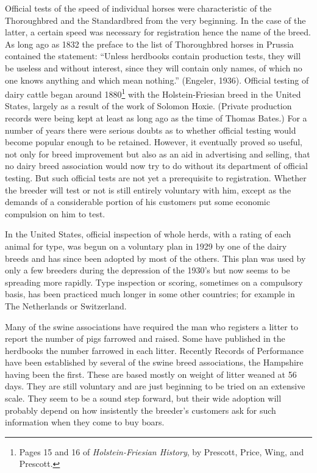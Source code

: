 Official tests of the speed of individual horses were characteristic of the Thoroughbred and the Standardbred from the very 
beginning. In the case of the latter, a certain speed was necessary for registration hence the name of the breed. As long 
ago as 1832 the preface to the list of Thoroughbred horses in Prussia contained the statement: ``Unless herdbooks contain 
production tests, they will be useless and without interest, since they will contain only names, of which no one knows
anything and which mean nothing.'' (Engeler, 1936). Official testing of dairy cattle began around 1880\footnote{Pages 15 and 
16 of \textit{Holstein-Friesian History}, by Prescott, Price, Wing, and Prescott.} with the Holstein-Friesian breed in the
United States, largely as a result of the work of Solomon Hoxie. (Private production records were being kept at least as 
long ago as the time of Thomas Bates.) For a number of years there were serious doubts as to whether official testing would 
become popular enough to be retained. However, it eventually proved so useful, not only for breed improvement but also as 
an aid in advertising and selling, that no dairy breed association would now try to do without its department of official 
testing. But such official tests are not yet a prerequisite to registration. Whether the breeder will test or not is still 
entirely voluntary with him, except as the demands of a considerable portion of his customers put some economic compulsion 
on him to test.

In the United States, official inspection of whole herds, with a rating of each animal for type, was begun on a voluntary 
plan in 1929 by one of the dairy breeds and has since been adopted by most of the others. This plan was used by only a few 
breeders during the depression of the 1930's but now seems to be spreading more rapidly. Type inspection or scoring, 
sometimes on a compulsory basis, has been practiced much longer in some other countries; for example in The Netherlands or
Switzerland.

Many of the swine associations have required the man who registers a litter to report the number of pigs farrowed and 
raised. Some have published in the herdbooks the number farrowed in each litter. Recently Records of Performance have been 
established by several of the swine breed associations, the Hampshire having been the first. These are based mostly on 
weight of litter weaned at 56 days. They are still voluntary and are just beginning to be tried on an extensive scale. They
seem to be a sound step forward, but their wide adoption will probably depend on how insistently the breeder's customers 
ask for such information when they come to buy boars.

